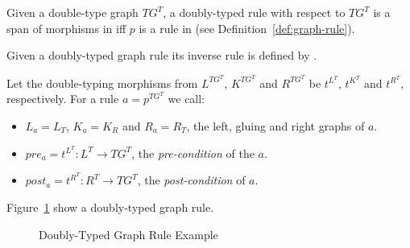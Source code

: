 \begin{definition} Given a double-type graph $TG^T$, a doubly-typed rule with respect to $TG^T$ is a span of morphisms \doublyTypedRule{} in \doublyTypedGraphCategory{} iff $p$ is a rule in \typedGraphCategory{} (see Definition~\ref{def:graph-rule}). 
  

  Given a doubly-typed graph rule \doublyTypedRule{} its inverse rule is defined by \inverseDoublyTypedRule{}.

  Let the double-typing morphisms from $L^{TG^T}$, $K^{TG^T}$ and $R^{TG^T}$ be $t^{L^T}$, $t^{K^T}$ and $t^{R^T}$, respectively. For a rule $a = p^{TG^T}$ we call:

  \begin{itemize}
    \item $L_a = L_T$, $K_a = K_R$ and $R_a = R_T$, the left, gluing and right graphs of $a$.
    \item $pre_a = t^{L^T} : L^T \rightarrow TG^T$, the \emph{pre-condition} of the $a$.
    \item $post_a = t^{R^T} : R^T \rightarrow TG^T$, the \emph{post-condition} of $a$.
  \end{itemize}

\end{definition}

\begin{example}Figure~\ref{fig:process:doubly-typed-graph-rule} show a doubly-typed graph rule.

\begin{figure}[!ht]
  \centering
  \caption{Doubly-Typed Graph Rule Example}\label{fig:process:doubly-typed-graph-rule}
\end{figure}
\end{example}

